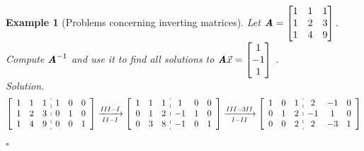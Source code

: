 \documentclass[12pt, a4paper]{article}
\newtheorem{eg}{Example}[subsection]
\newenvironment*{sol}{\indent\textit{Solution. }}{\hfill{$\square$}\par}
\def\vecx{\vec{x}}
\def\matrixA{\textbf{\emph{A}}}
\begin{document}
\begin{eg}[Problems concerning inverting matrices]
	Let $\matrixA=\begin{bmatrix}1&1&1\\1&2&3\\1&4&9\end{bmatrix}.$ Compute $\matrixA^{-1}$ and use it to find all solutions to $\matrixA\vecx=\begin{bmatrix}1\\-1\\1\end{bmatrix}$	.\\
	\begin{sol}
		$$\begin{aligned}
			\left[\begin{array}{c:c}\begin{matrix}1&1&1\\1&2&3\\1&4&9\end{matrix}&\begin{matrix}1&0&0\\0&1&0\\0&0&1\end{matrix}\end{array}\right]&\xrightarrow[II-I]{III-I}\left[\begin{array}{c:c}\begin{matrix}1&1&1\\0&1&2\\0&3&8\end{matrix}&\begin{matrix}1&0&0\\-1&1&0\\-1&0&1\end{matrix}\end{array}\right]\xrightarrow[I-II]{III-3II}\left[\begin{array}{c:c}\begin{matrix}1&0&1\\0&1&2\\0&0&2\end{matrix}&\begin{matrix}2&-1&0\\-1&1&0\\2&-3&1\end{matrix}\end{array}\right]\\

\end{aligned}$$
\end{sol}
\end{eg}
\end{document}
